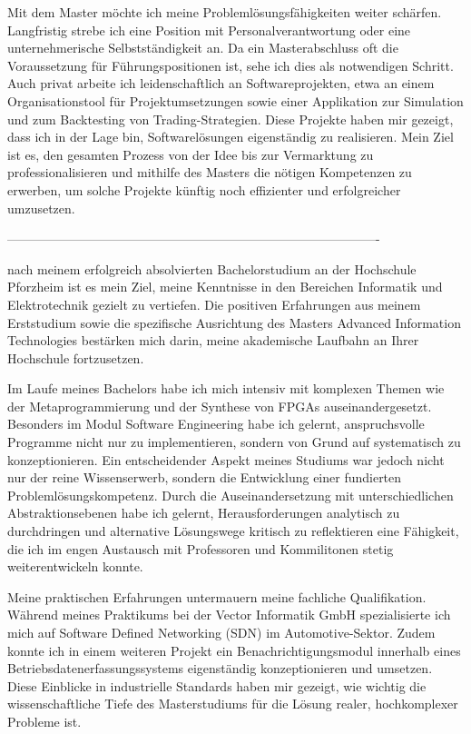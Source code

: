 \documentclass[a4paper, 10pt]{letter}
\begin{document}
\begin{letter}
Mit dem Master möchte ich meine Problemlösungsfähigkeiten weiter schärfen. Langfristig strebe ich eine Position mit Personalverantwortung oder eine unternehmerische Selbstständigkeit an. Da ein Masterabschluss oft die Voraussetzung für Führungspositionen ist, sehe ich dies als notwendigen Schritt. Auch privat arbeite ich leidenschaftlich an Softwareprojekten, etwa an einem Organisationstool für Projektumsetzungen sowie einer Applikation zur Simulation und zum Backtesting von Trading-Strategien. Diese Projekte haben mir gezeigt, dass ich in der Lage bin, Softwarelösungen eigenständig zu realisieren. Mein Ziel ist es, den gesamten Prozess von der Idee bis zur Vermarktung zu professionalisieren und mithilfe des Masters die nötigen Kompetenzen zu erwerben, um solche Projekte künftig noch effizienter und erfolgreicher umzusetzen.


----------------------------------------------------------------------------------------


nach meinem erfolgreich absolvierten Bachelorstudium an der Hochschule Pforzheim ist es mein Ziel, meine Kenntnisse in den Bereichen Informatik und Elektrotechnik gezielt zu vertiefen. Die positiven Erfahrungen aus meinem Erststudium sowie die spezifische Ausrichtung des Masters Advanced Information Technologies bestärken mich darin, meine akademische Laufbahn an Ihrer Hochschule fortzusetzen.

Im Laufe meines Bachelors habe ich mich intensiv mit komplexen Themen wie der Metaprogrammierung und der Synthese von FPGAs auseinandergesetzt. Besonders im Modul Software Engineering habe ich gelernt, anspruchsvolle Programme nicht nur zu implementieren, sondern von Grund auf systematisch zu konzeptionieren. Ein entscheidender Aspekt meines Studiums war jedoch nicht nur der reine Wissenserwerb, sondern die Entwicklung einer fundierten Problemlösungskompetenz. Durch die Auseinandersetzung mit unterschiedlichen Abstraktionsebenen habe ich gelernt, Herausforderungen analytisch zu durchdringen und alternative Lösungswege kritisch zu reflektieren eine Fähigkeit, die ich im engen Austausch mit Professoren und Kommilitonen stetig weiterentwickeln konnte.

Meine praktischen Erfahrungen untermauern meine fachliche Qualifikation. Während meines Praktikums bei der Vector Informatik GmbH spezialisierte ich mich auf Software Defined Networking (SDN) im Automotive-Sektor. Zudem konnte ich in einem weiteren Projekt ein Benachrichtigungsmodul innerhalb eines Betriebsdatenerfassungssystems eigenständig konzeptionieren und umsetzen. Diese Einblicke in industrielle Standards haben mir gezeigt, wie wichtig die wissenschaftliche Tiefe des Masterstudiums für die Lösung realer, hochkomplexer Probleme ist.


\end{letter}
\end{document}
